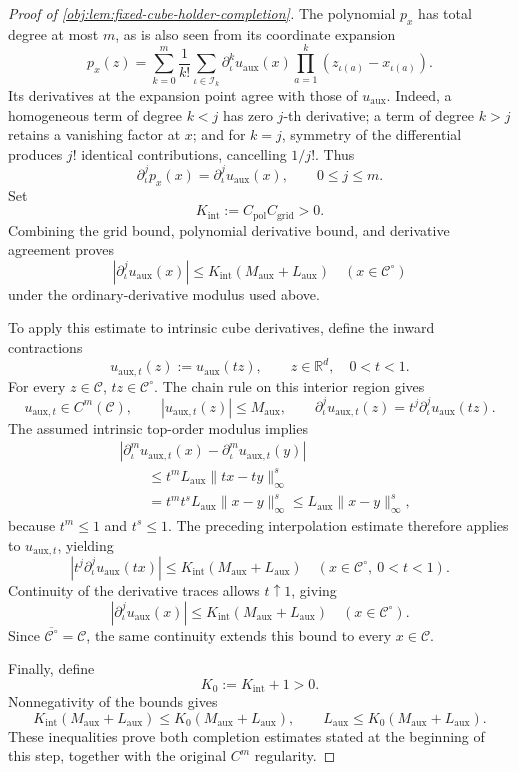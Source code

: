 \documentclass[11pt]{article}
\begin{document}
\begin{proof}[Proof of \cref{obj:lem:fixed-cube-holder-completion}]
The polynomial \(p_x\) has total degree at most \(m\), as is also seen from its coordinate expansion
\[
p_x(z)=
\sum_{k=0}^m\frac{1}{k!}
\sum_{\iota\in\mathscr I_k}
\partial_\iota^k u_{\mathrm{aux}}(x)
\prod_{a=1}^k(z_{\iota(a)}-x_{\iota(a)}).
\]
Its derivatives at the expansion point agree with those of \(u_{\mathrm{aux}}\). Indeed, a homogeneous term of degree \(k<j\) has zero \(j\)-th derivative; a term of degree \(k>j\) retains a vanishing factor at \(x\); and for \(k=j\), symmetry of the differential produces \(j!\) identical contributions, cancelling \(1/j!\). Thus
\[
\partial_\iota^j p_x(x)
=
\partial_\iota^j u_{\mathrm{aux}}(x),
\qquad 0\le j\le m.
\]
Set
\[
K_{\mathrm{int}}:=C_{\mathrm{pol}}C_{\mathrm{grid}}>0.
\]
Combining the grid bound, polynomial derivative bound, and derivative agreement proves
\[
|\partial_\iota^j u_{\mathrm{aux}}(x)|
\le K_{\mathrm{int}}(M_{\mathrm{aux}}+L_{\mathrm{aux}})
\quad(x\in\mathscr C^\circ)
\]
under the ordinary-derivative modulus used above.

To apply this estimate to intrinsic cube derivatives, define the inward contractions
\[
u_{\mathrm{aux},t}(z):=u_{\mathrm{aux}}(tz),
\qquad z\in\mathbb R^d,\quad 0<t<1.
\]
For every \(z\in\mathscr C\), \(tz\in\mathscr C^\circ\). The chain rule on this interior region gives
\[
u_{\mathrm{aux},t}\in C^m(\mathscr C),\qquad
|u_{\mathrm{aux},t}(z)|\le M_{\mathrm{aux}},
\qquad
\partial_\iota^j u_{\mathrm{aux},t}(z)
=t^j\partial_\iota^j u_{\mathrm{aux}}(tz).
\]
The assumed intrinsic top-order modulus implies
\[
\begin{aligned}
&|\partial_\iota^m u_{\mathrm{aux},t}(x)
-\partial_\iota^m u_{\mathrm{aux},t}(y)|\\
&\qquad\le
t^mL_{\mathrm{aux}}\|tx-ty\|_\infty^s\\
&\qquad=
t^m t^s L_{\mathrm{aux}}\|x-y\|_\infty^s
\le L_{\mathrm{aux}}\|x-y\|_\infty^s,
\end{aligned}
\]
because \(t^m\le1\) and \(t^s\le1\). The preceding interpolation estimate therefore applies to \(u_{\mathrm{aux},t}\), yielding
\[
|t^j\partial_\iota^j u_{\mathrm{aux}}(tx)|
\le K_{\mathrm{int}}(M_{\mathrm{aux}}+L_{\mathrm{aux}})
\quad(x\in\mathscr C^\circ,\ 0<t<1).
\]
Continuity of the derivative traces allows \(t\uparrow1\), giving
\[
|\partial_\iota^j u_{\mathrm{aux}}(x)|
\le K_{\mathrm{int}}(M_{\mathrm{aux}}+L_{\mathrm{aux}})
\quad(x\in\mathscr C^\circ).
\]
Since \(\overline{\mathscr C^\circ}=\mathscr C\), the same continuity extends this bound to every \(x\in\mathscr C\).

Finally, define
\[
K_0:=K_{\mathrm{int}}+1>0.
\]
Nonnegativity of the bounds gives
\[
K_{\mathrm{int}}(M_{\mathrm{aux}}+L_{\mathrm{aux}})
\le K_0(M_{\mathrm{aux}}+L_{\mathrm{aux}}),
\qquad
L_{\mathrm{aux}}
\le K_0(M_{\mathrm{aux}}+L_{\mathrm{aux}}).
\]
These inequalities prove both completion estimates stated at the beginning of this step, together with the original \(C^m\) regularity.


\end{proof}
\end{document}
